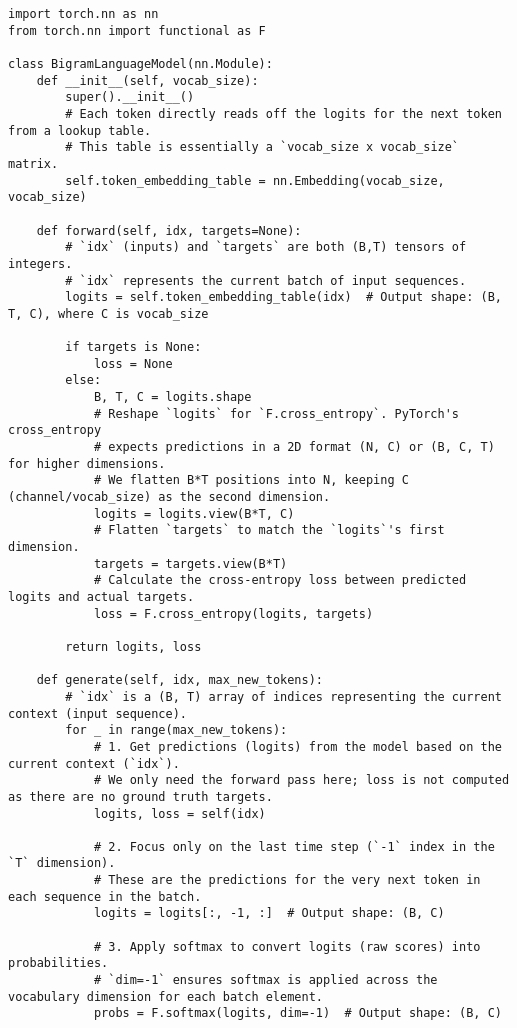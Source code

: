 \begin{lstlisting}[caption={BigramLanguageModel class}]
import torch.nn as nn
from torch.nn import functional as F

class BigramLanguageModel(nn.Module):
    def __init__(self, vocab_size):
        super().__init__()
        # Each token directly reads off the logits for the next token from a lookup table.
        # This table is essentially a `vocab_size x vocab_size` matrix.
        self.token_embedding_table = nn.Embedding(vocab_size, vocab_size)

    def forward(self, idx, targets=None):
        # `idx` (inputs) and `targets` are both (B,T) tensors of integers.
        # `idx` represents the current batch of input sequences.
        logits = self.token_embedding_table(idx)  # Output shape: (B, T, C), where C is vocab_size

        if targets is None:
            loss = None
        else:
            B, T, C = logits.shape
            # Reshape `logits` for `F.cross_entropy`. PyTorch's cross_entropy
            # expects predictions in a 2D format (N, C) or (B, C, T) for higher dimensions.
            # We flatten B*T positions into N, keeping C (channel/vocab_size) as the second dimension.
            logits = logits.view(B*T, C)
            # Flatten `targets` to match the `logits`'s first dimension.
            targets = targets.view(B*T)
            # Calculate the cross-entropy loss between predicted logits and actual targets.
            loss = F.cross_entropy(logits, targets)

        return logits, loss

    def generate(self, idx, max_new_tokens):
        # `idx` is a (B, T) array of indices representing the current context (input sequence).
        for _ in range(max_new_tokens):
            # 1. Get predictions (logits) from the model based on the current context (`idx`).
            # We only need the forward pass here; loss is not computed as there are no ground truth targets.
            logits, loss = self(idx) 
            
            # 2. Focus only on the last time step (`-1` index in the `T` dimension).
            # These are the predictions for the very next token in each sequence in the batch.
            logits = logits[:, -1, :]  # Output shape: (B, C)
            
            # 3. Apply softmax to convert logits (raw scores) into probabilities.
            # `dim=-1` ensures softmax is applied across the vocabulary dimension for each batch element.
            probs = F.softmax(logits, dim=-1)  # Output shape: (B, C)
            

\end{lstlisting}

